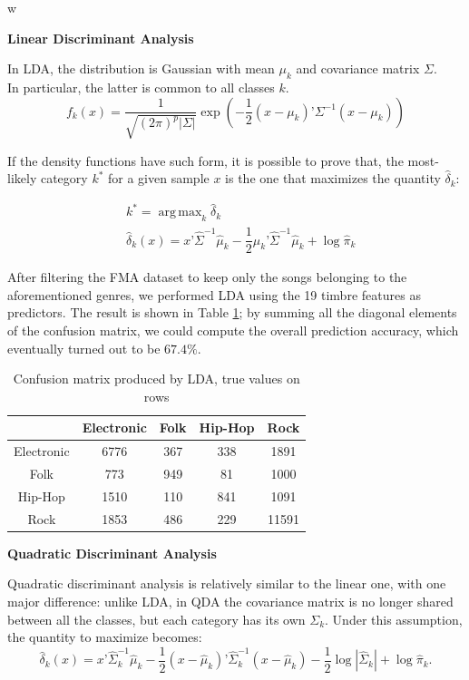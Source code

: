 w\documentclass[11pt, oneside]{article}
\DeclareMathOperator*{\argmax}{arg\,max}
\begin{document}
\noindent\textbf{Linear Discriminant Analysis}

In LDA, the distribution is Gaussian with mean $\mu_k$ and covariance matrix $\Sigma$. \\
In particular, the latter is common to all classes $k$.
\begin{equation*}
    f_k(x) = \frac{1}{\sqrt{(2\pi)^p |\Sigma|}}\exp{\left(-\frac{1}{2}{\left(x-\mu_k\right)}’\Sigma^{-1}\left(x-\mu_k\right)\right)}
\end{equation*}

If the density functions have such form, it is possible to prove that, the most-likely category $k^*$ for a given sample $x$ is the one that maximizes the quantity $\hat{\delta}_k$:

\begin{align*}
    &k^* = \argmax_k{\hat{\delta}_k}\\
    &\hat{\delta}_k(x) = x’ \hat{\Sigma}^{-1} \hat{\mu}_k - \dfrac{1}{2}\hat{\mu}_k’ \hat{\Sigma}^{-1} \hat{\mu}_k + \log{\hat{\pi}_k}
\end{align*}

After filtering the FMA dataset to keep only the songs belonging to the aforementioned genres, we performed LDA using the 19 timbre features as predictors.
The result is shown in Table \ref{table:ldaconfusion}; by summing all the diagonal elements of the confusion matrix, we could compute the overall prediction accuracy, which eventually turned out to be $67.4\%$.

\begin{table}[h]
\centering
\begin{tabular}{|c|c|c|c|c|}
    \hline
                & Electronic & Folk & Hip-Hop & Rock \\ \hline
    Electronic  &   6776    &  367  &  338  &  1891 \\ \hline
    Folk        &   773     &  949  &  81   &  1000 \\ \hline
    Hip-Hop     &   1510    &  110  &  841  &  1091 \\ \hline
    Rock        &   1853    &  486  &  229  &  11591 \\ \hline
\end{tabular}
\caption{Confusion matrix produced by LDA, true values on rows}
\label{table:ldaconfusion}
\end{table}

\noindent\textbf{Quadratic Discriminant Analysis}

Quadratic discriminant analysis is relatively similar to the linear one, with one major difference: unlike LDA, in QDA the covariance matrix is no longer shared between all the classes, but each category has its own $\Sigma_k$.
Under this assumption, the quantity to maximize becomes:
\begin{equation*}
    \hat{\delta}_k(x) = x’ \hat{\Sigma}^{-1}_k \hat{\mu}_k -\dfrac{1}{2} (x - \hat{\mu}_k)’ \hat{\Sigma}^{-1}_k (x-\hat{\mu}_k) -\dfrac{1}{2}\log \left|\hat{\Sigma}_k\right|+ \log{\hat{\pi}_k}.
\end{equation*}
\end{document}
